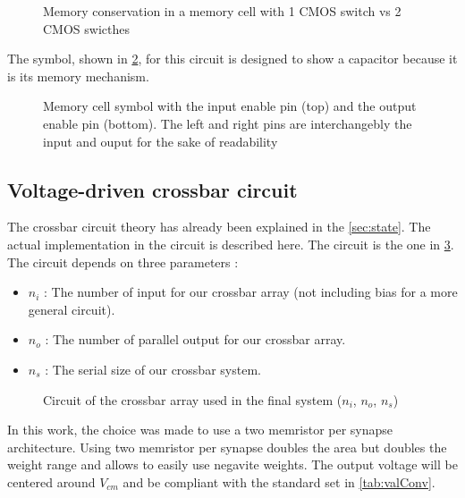 \begin{figure}[t]
  \centering
  
  \caption{Memory conservation in a memory cell with 1 \ac{CMOS} switch vs 2 \ac{CMOS} swicthes}
  \label{fig:memcellLoss}
\end{figure}

The symbol, shown in \cref{sym:memcell}, for this circuit is designed to show a capacitor because it is its memory mechanism.

\begin{figure}[t]
  \centering
  
  \caption{Memory cell symbol with the input enable pin (top) and the output enable pin (bottom). The left and right pins are interchangebly the input and ouput for the sake of readability}
  \label{sym:memcell}
\end{figure}

\subsection{Voltage-driven crossbar circuit}\label{subsec:xbarCircuit}

The crossbar circuit theory has already been explained in the \cref{sec:state}. The actual implementation in the circuit is described here. The circuit is the one in \cref{circt:xbar}. The circuit depends on three parameters :

\begin{itemize}
  \item $n_i$ : The number of input for our crossbar array (not including bias for a more general circuit).
  \item $n_o$ : The number of parallel output for our crossbar array.
  \item $n_s$ : The serial size of our crossbar system.
\end{itemize}

\begin{figure}[b]
  \centering
  
  \caption{Circuit of the crossbar array used in the final system ($n_i$, $n_o$, $n_s$)}
  \label{circt:xbar}
\end{figure}

In this work, the choice was made to use a two memristor per synapse architecture. Using two memristor per synapse doubles the area but doubles the weight range \cite{doubleMem} and allows to easily use negavite weights. The output voltage will be centered around $V_{cm}$ and be compliant with the standard set in \cref{tab:valConv}.

